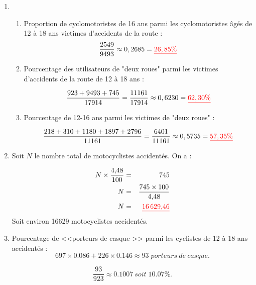 \documentclass[12pt,a4paper]{article}
\begin{document}
\begin{enumerate}[label=\arabic*.]
	\item 
	\begin{enumerate} [label=\alph*) ]
		\item Proportion de cyclomotoristes de 16 ans parmi les cyclomotoristes âgés de 12 à 18 ans victimes d'accidents de la route :
			\begin{eqnarray*}
				\dfrac{2549}{9493} \approx 0,2685 = \textcolor{red}{\underline{26,85\%}}
			\end{eqnarray*}
			
		\item Pourcentage des utilisateurs de "deux roues" parmi les victimes d'accidents de la route de 12 à 18 ans :
		
			\begin{equation*}
				\dfrac{923 + 9493 + 745}{17914} = \dfrac{11 161}{17914} \approx 0,6230 = \textcolor{red}{\underline{62,30 \%}}
			\end{equation*}
			
		\item Pourcentage de 12-16 ans parmi les victimes de "deux roues" :
		
			\begin{equation*}
				\dfrac{218 + 310 + 1180 + 1897 + 2796}{11161} = \dfrac{6401}{11161} \approx 0,5735 = \textcolor{red}{\underline{57,35 \%}}
			\end{equation*}
	\end{enumerate}

	\item Soit $N$ le nombre total de motocyclistes accidentés. On a :
	
		\begin{eqnarray*}
			N \times \dfrac{\num{4.48}}{100} &=& 745 \\
			N &=& \dfrac{745 \times 100}{\num{4.48}} \\
			N &=&  \textcolor{red}{\underline{\num{16629.46}}}
		\end{eqnarray*}
	Soit environ \num{16629} motocyclistes accidentés.
	
	\item Pourcentage de <<porteurs de casque >> parmi les cyclistes de 12 à 18 ans accidentés :
		\begin{equation*}
			\num{697} \times \num{0.086} + \num{226} \times \num{0.146} \approx 93 \; porteurs \: de \: casque.
		\end{equation*}
			
		\begin{equation*}
			\dfrac{93}{923} \approx \num{0.1007} \: soit \; \num{10.07}\%. 
		\end{equation*}
\end{enumerate}
\end{document}
